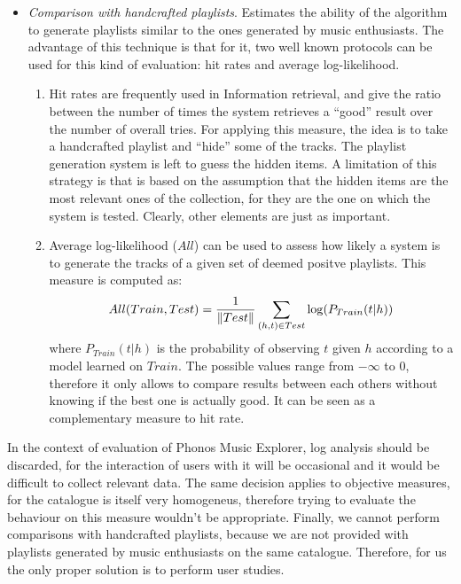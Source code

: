 \begin{itemize}
\item \textit{Comparison with handcrafted playlists}. Estimates the ability of the algorithm to generate playlists similar to the ones generated by music enthusiasts. The advantage of this technique is that for it, two well known protocols can be used for this kind of evaluation: hit rates and average log-likelihood. 
\begin{enumerate}
\item Hit rates are frequently used in Information retrieval, and give the ratio between the number of times the system retrieves a ``good'' result over the number of overall tries. For applying this measure, the idea is to take a handcrafted playlist and ``hide'' some of the tracks. The playlist generation system is left to guess the hidden items. A limitation of this strategy is that is based on the assumption that the hidden items are the most relevant ones of the collection, for they are the one on which the system is tested. Clearly, other elements are just as important. 
\item Average log-likelihood ($All$) can be used to assess how likely a system is to generate the tracks of a given set of deemed positve playlists. This measure is computed as:
\begin{equation}
All(Train, Test) = \frac{1}{\lVert Test\rVert} \sum\limits_{(h,t) \in Test}^{} \log (P_{Train} (t | h))
\end{equation}
where $P_{Train}(t|h)$ is the probability of observing $t$ given $h$ according to a model learned on $Train$. The possible values range from $- \infty$ to 0, therefore it only allows to compare results between each others without knowing if the best one is actually good. It can be seen as a complementary measure to hit rate.
\end{enumerate}
\end{itemize}

In the context of evaluation of Phonos Music Explorer, log analysis should be discarded, for the interaction of users with it will be occasional and it would be difficult to collect relevant data. The same decision applies to objective measures, for the catalogue is itself very homogeneus, therefore trying to evaluate the behaviour on this measure wouldn't be appropriate. Finally, we cannot perform comparisons with handcrafted playlists, because we are not provided with playlists generated by music enthusiasts on the same catalogue. Therefore, for us the only proper solution is to perform user studies. 

